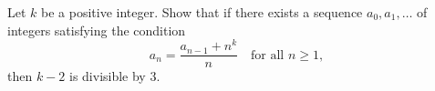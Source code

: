 Let $k$ be a positive integer. Show that if there exists a sequence $a_0, a_1, \ldots$ of integers satisfying the condition
\[
a_n = \frac{a_{n-1} + n^k}{n} \quad \text{for all } n \geq 1,
\]
then $k - 2$ is divisible by $3$.
